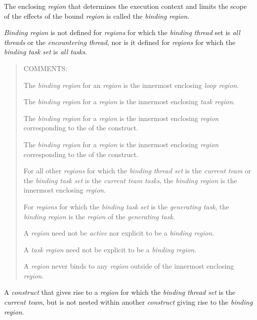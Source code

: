 \glossarydefstart
The enclosing \emph{region} that determines the execution context and limits 
the scope of the effects of the bound \emph{region} is called the 
\emph{binding region}.

\emph{Binding region} is not defined for \emph{regions} for which the 
\emph{binding thread} set is \emph{all threads} or the 
\emph{encountering thread}, nor is it defined for \emph{regions} for 
which the \emph{binding task set} is \emph{all tasks}.

\begin{quote}
COMMENTS:

The \emph{binding region} for an  \emph{region} is the 
innermost enclosing \emph{loop region}.

The \emph{binding region} for a  \emph{region} is the 
innermost enclosing \emph{task region}.

The \emph{binding region} for a  \emph{region} is the 
innermost enclosing \emph{region} corresponding to the 
 of the  construct.

The \emph{binding region} for a  \emph{region} 
is the innermost enclosing \emph{region} corresponding to the 
 of the  construct.

For all other \emph{regions} for which the \emph{binding thread set} is 
the \emph{current team} or the \emph{binding task set} is the 
\emph{current team tasks}, the \emph{binding region} is the innermost 
enclosing  \emph{region}.

For \emph{regions} for which the \emph{binding task set} is the 
\emph{generating task}, the \emph{binding region} is the \emph{region} 
of the \emph{generating task}.

A  \emph{region} need not be \emph{active} nor explicit 
to be a \emph{binding region}.

A \emph{task region} need not be explicit to be a \emph{binding region}.

A \emph{region} never binds to any \emph{region} outside of the innermost 
enclosing  \emph{region}.
\end{quote}
\glossarydefend

\glossarydefstart
A \emph{construct} that gives rise to a \emph{region} for which the 
\emph{binding thread set} is the \emph{current team}, but is not nested 
within another \emph{construct} giving rise to the \emph{binding region}.
\glossarydefend

